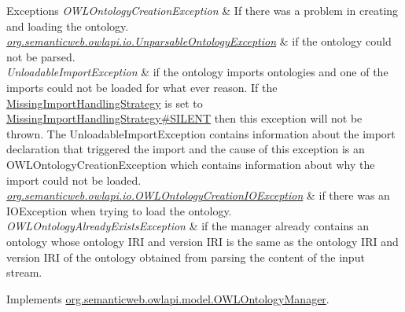 \begin{DoxyExceptions}{Exceptions}
{\em O\-W\-L\-Ontology\-Creation\-Exception} & If there was a problem in creating and loading the ontology. \\
\hline
{\em \hyperlink{classorg_1_1semanticweb_1_1owlapi_1_1io_1_1_unparsable_ontology_exception}{org.\-semanticweb.\-owlapi.\-io.\-Unparsable\-Ontology\-Exception}} & if the ontology could not be parsed. \\
\hline
{\em Unloadable\-Import\-Exception} & if the ontology imports ontologies and one of the imports could not be loaded for what ever reason. If the \hyperlink{}{Missing\-Import\-Handling\-Strategy} is set to \hyperlink{enumorg_1_1semanticweb_1_1owlapi_1_1model_1_1_missing_import_handling_strategy_aed66060ec95dc4ad59ca4dd82509782b}{Missing\-Import\-Handling\-Strategy\#\-S\-I\-L\-E\-N\-T} then this exception will not be thrown. The {\ttfamily Unloadable\-Import\-Exception} contains information about the import declaration that triggered the import and the cause of this exception is an {\ttfamily O\-W\-L\-Ontology\-Creation\-Exception} which contains information about why the import could not be loaded. \\
\hline
{\em \hyperlink{classorg_1_1semanticweb_1_1owlapi_1_1io_1_1_o_w_l_ontology_creation_i_o_exception}{org.\-semanticweb.\-owlapi.\-io.\-O\-W\-L\-Ontology\-Creation\-I\-O\-Exception}} & if there was an {\ttfamily I\-O\-Exception} when trying to load the ontology. \\
\hline
{\em O\-W\-L\-Ontology\-Already\-Exists\-Exception} & if the manager already contains an ontology whose ontology I\-R\-I and version I\-R\-I is the same as the ontology I\-R\-I and version I\-R\-I of the ontology obtained from parsing the content of the input stream. \\
\hline
\end{DoxyExceptions}


Implements \hyperlink{interfaceorg_1_1semanticweb_1_1owlapi_1_1model_1_1_o_w_l_ontology_manager_ab3f51136b6d7cdee2b07ebee20a1d7e8}{org.\-semanticweb.\-owlapi.\-model.\-O\-W\-L\-Ontology\-Manager}.

